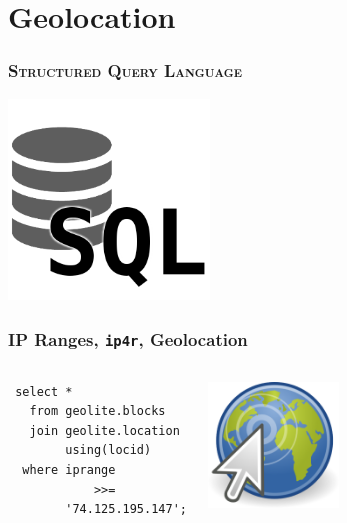 \documentclass{beamer}
\begin{document}
\section{Geolocation}

\begin{frame}
  \frametitle{\textsc{Structured Query Language}}

  \begin{center}
    \includegraphics[height=2.1in]{sql.png}
  \end{center}
\end{frame}

\begin{frame}[fragile]
  \frametitle{IP Ranges, \texttt{ip4r}, Geolocation}

  \vfill

\begin{columns}
\begin{verbatim}
 select *
   from geolite.blocks
   join geolite.location
        using(locid)
  where iprange
            >>=
        '74.125.195.147';
\end{verbatim}
\begin{center}
  \includegraphics[height=9em]{geolocation-clic.png}
\end{center}
\end{columns}
\end{frame}
\end{document}
